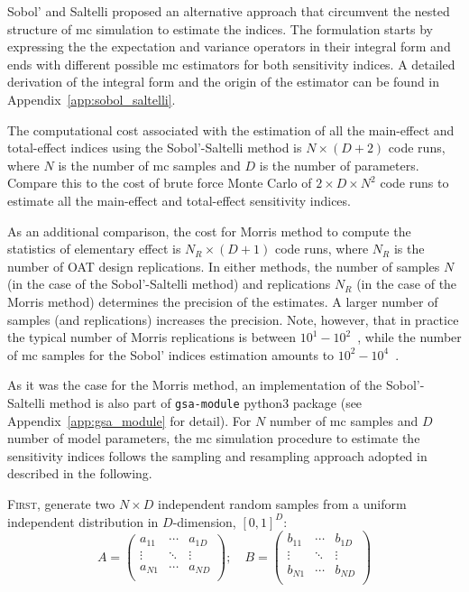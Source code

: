Sobol' \cite{Sobol2001} and Saltelli \cite{Saltelli2002} proposed an alternative approach that circumvent the nested structure of \gls{mc} simulation to estimate the indices.
The formulation starts by expressing the the expectation and variance operators in their integral form 
and ends with different possible \gls{mc} estimators for both sensitivity indices.
A detailed derivation of the integral form and the origin of the estimator can be found in Appendix~\ref{app:sobol_saltelli}. 

The computational cost associated with the estimation of all the main-effect and total-effect indices using the Sobol'-Saltelli method is $N \times (D + 2)$ code runs,
where $N$ is the number of \gls{mc} samples and $D$ is the number of parameters.
Compare this to the cost of brute force Monte Carlo of $2 \times D \times N^2$ code runs to estimate all the main-effect and total-effect sensitivity indices. 

As an additional comparison, the cost for Morris method to compute the statistics of elementary effect is $N_R \times (D + 1)$ code runs,
where $N_R$ is the number of OAT design replications.
In either methods, the number of samples $N$ (in the case of the Sobol'-Saltelli method) and replications $N_R$ (in the case of the Morris method)
determines the precision of the estimates.
A larger number of samples (and replications) increases the precision.
Note, however, that in practice the typical number of Morris replications is between $10^1 - 10^2$~\cite{Saltelli2010}, 
while the number of \gls{mc} samples for the Sobol' indices estimation amounts to $10^2 - 10^4$~\cite{Sobol2001}.

As it was the case for the Morris method, an implementation of the Sobol'-Saltelli method is also part of \texttt{gsa-module} python3 package (see Appendix~\ref{app:gsa_module} for detail). 
For $N$ number of \gls{mc} samples and $D$ number of model parameters, the \gls{mc} simulation procedure to estimate the sensitivity indices follows the sampling and resampling approach adopted in~\cite{Sobol2001,Saltelli2002,Homma1996} described in the following.

\textsc{First}, generate two $N \times D$ independent random samples from a uniform independent distribution in $D$-dimension, $[0,1]^D$:
\begin{equation}
A = 
\begin{pmatrix}
a_{11}  & \cdots  & a_{1D}\\
\vdots	& \ddots & \vdots\\
a_{N1}  & \cdots  & a_{ND}\\
\end{pmatrix}
;\quad B = 
\begin{pmatrix}
b_{11}  & \cdots  & b_{1D}\\
\vdots	& \ddots & \vdots\\
b_{N1}  & \cdots  & b_{ND}\\
\end{pmatrix}
\label{eq:ss_two_samples}
\end{equation}

